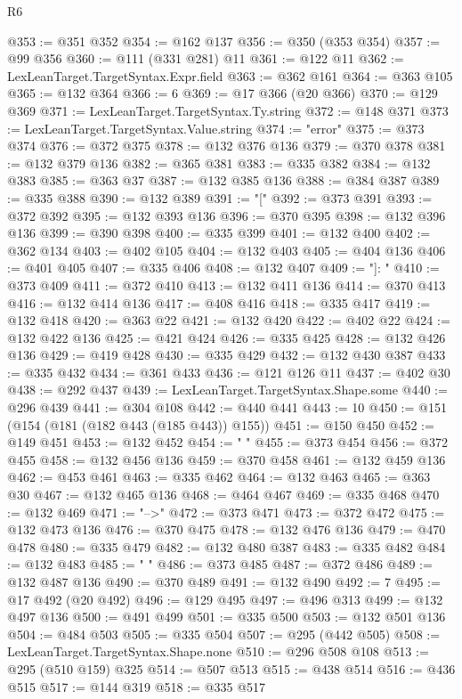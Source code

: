 \begin{lexlean}{R6}
\begin{coremodule}
@353 := @351 @352
@354 := @162 @137
@356 := @350 (@353 @354)
@357 := @99 @356
@360 := @111 (@331 @281) @11
@361 := @122 @11
@362 := LexLeanTarget.TargetSyntax.Expr.field
@363 := @362 @161
@364 := @363 @105
@365 := @132 @364
@366 := 6
@369 := @17 @366 (@20 @366)
@370 := @129 @369
@371 := LexLeanTarget.TargetSyntax.Ty.string
@372 := @148 @371
@373 := LexLeanTarget.TargetSyntax.Value.string
@374 := "error"
@375 := @373 @374
@376 := @372 @375
@378 := @132 @376 @136
@379 := @370 @378
@381 := @132 @379 @136
@382 := @365 @381
@383 := @335 @382
@384 := @132 @383
@385 := @363 @37
@387 := @132 @385 @136
@388 := @384 @387
@389 := @335 @388
@390 := @132 @389
@391 := "["
@392 := @373 @391
@393 := @372 @392
@395 := @132 @393 @136
@396 := @370 @395
@398 := @132 @396 @136
@399 := @390 @398
@400 := @335 @399
@401 := @132 @400
@402 := @362 @134
@403 := @402 @105
@404 := @132 @403
@405 := @404 @136
@406 := @401 @405
@407 := @335 @406
@408 := @132 @407
@409 := "]: "
@410 := @373 @409
@411 := @372 @410
@413 := @132 @411 @136
@414 := @370 @413
@416 := @132 @414 @136
@417 := @408 @416
@418 := @335 @417
@419 := @132 @418
@420 := @363 @22
@421 := @132 @420
@422 := @402 @22
@424 := @132 @422 @136
@425 := @421 @424
@426 := @335 @425
@428 := @132 @426 @136
@429 := @419 @428
@430 := @335 @429
@432 := @132 @430 @387
@433 := @335 @432
@434 := @361 @433
@436 := @121 @126 @11
@437 := @402 @30
@438 := @292 @437
@439 := LexLeanTarget.TargetSyntax.Shape.some
@440 := @296 @439
@441 := @304 @108
@442 := @440 @441
@443 := 10
@450 := @151 (@154 (@181 (@182 @443 (@185 @443)) @155))
@451 := @150 @450
@452 := @149 @451
@453 := @132 @452
@454 := "  "
@455 := @373 @454
@456 := @372 @455
@458 := @132 @456 @136
@459 := @370 @458
@461 := @132 @459 @136
@462 := @453 @461
@463 := @335 @462
@464 := @132 @463
@465 := @363 @30
@467 := @132 @465 @136
@468 := @464 @467
@469 := @335 @468
@470 := @132 @469
@471 := "-->"
@472 := @373 @471
@473 := @372 @472
@475 := @132 @473 @136
@476 := @370 @475
@478 := @132 @476 @136
@479 := @470 @478
@480 := @335 @479
@482 := @132 @480 @387
@483 := @335 @482
@484 := @132 @483
@485 := " "
@486 := @373 @485
@487 := @372 @486
@489 := @132 @487 @136
@490 := @370 @489
@491 := @132 @490
@492 := 7
@495 := @17 @492 (@20 @492)
@496 := @129 @495
@497 := @496 @313
@499 := @132 @497 @136
@500 := @491 @499
@501 := @335 @500
@503 := @132 @501 @136
@504 := @484 @503
@505 := @335 @504
@507 := @295 (@442 @505)
@508 := LexLeanTarget.TargetSyntax.Shape.none
@510 := @296 @508 @108
@513 := @295 (@510 @159) @325
@514 := @507 @513
@515 := @438 @514
@516 := @436 @515
@517 := @144 @319
@518 := @335 @517

\end{coremodule}
\end{lexlean}
